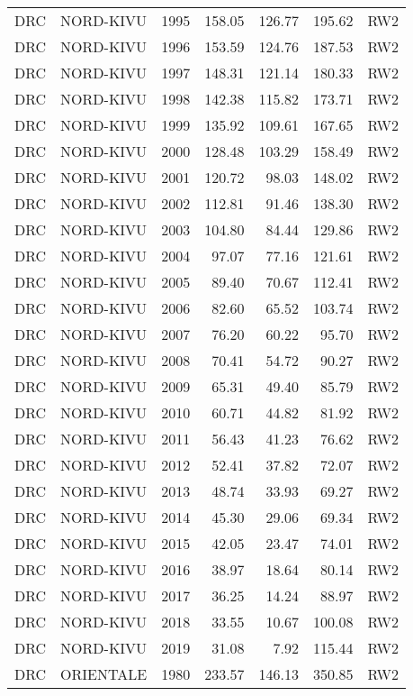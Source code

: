 \begin{longtable}{lllrrrl}
  DRC & NORD-KIVU & 1995 & 158.05 & 126.77 & 195.62 & RW2 \\ 
  DRC & NORD-KIVU & 1996 & 153.59 & 124.76 & 187.53 & RW2 \\ 
  DRC & NORD-KIVU & 1997 & 148.31 & 121.14 & 180.33 & RW2 \\ 
  DRC & NORD-KIVU & 1998 & 142.38 & 115.82 & 173.71 & RW2 \\ 
  DRC & NORD-KIVU & 1999 & 135.92 & 109.61 & 167.65 & RW2 \\ 
  DRC & NORD-KIVU & 2000 & 128.48 & 103.29 & 158.49 & RW2 \\ 
  DRC & NORD-KIVU & 2001 & 120.72 & 98.03 & 148.02 & RW2 \\ 
  DRC & NORD-KIVU & 2002 & 112.81 & 91.46 & 138.30 & RW2 \\ 
  DRC & NORD-KIVU & 2003 & 104.80 & 84.44 & 129.86 & RW2 \\ 
  DRC & NORD-KIVU & 2004 & 97.07 & 77.16 & 121.61 & RW2 \\ 
  DRC & NORD-KIVU & 2005 & 89.40 & 70.67 & 112.41 & RW2 \\ 
  DRC & NORD-KIVU & 2006 & 82.60 & 65.52 & 103.74 & RW2 \\ 
  DRC & NORD-KIVU & 2007 & 76.20 & 60.22 & 95.70 & RW2 \\ 
  DRC & NORD-KIVU & 2008 & 70.41 & 54.72 & 90.27 & RW2 \\ 
  DRC & NORD-KIVU & 2009 & 65.31 & 49.40 & 85.79 & RW2 \\ 
  DRC & NORD-KIVU & 2010 & 60.71 & 44.82 & 81.92 & RW2 \\ 
  DRC & NORD-KIVU & 2011 & 56.43 & 41.23 & 76.62 & RW2 \\ 
  DRC & NORD-KIVU & 2012 & 52.41 & 37.82 & 72.07 & RW2 \\ 
  DRC & NORD-KIVU & 2013 & 48.74 & 33.93 & 69.27 & RW2 \\ 
  DRC & NORD-KIVU & 2014 & 45.30 & 29.06 & 69.34 & RW2 \\ 
  DRC & NORD-KIVU & 2015 & 42.05 & 23.47 & 74.01 & RW2 \\ 
  DRC & NORD-KIVU & 2016 & 38.97 & 18.64 & 80.14 & RW2 \\ 
  DRC & NORD-KIVU & 2017 & 36.25 & 14.24 & 88.97 & RW2 \\ 
  DRC & NORD-KIVU & 2018 & 33.55 & 10.67 & 100.08 & RW2 \\ 
  DRC & NORD-KIVU & 2019 & 31.08 & 7.92 & 115.44 & RW2 \\ 
  DRC & ORIENTALE & 1980 & 233.57 & 146.13 & 350.85 & RW2 \\ 

\end{longtable}
